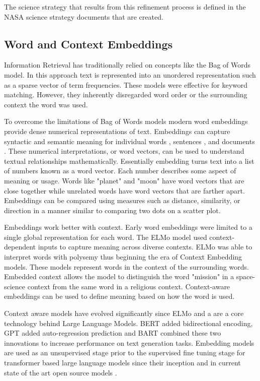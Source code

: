 \documentclass[preprint,12pt,doubleblind]{elsarticle}
\begin{document}
The science strategy that results from this refinement process is defined in the NASA science strategy documents that are created.

\subsection{Word and Context Embeddings}
Information Retrieval has traditionally relied on concepts like the Bag of Words model\cite{harris1954}. In this approach text is represented into an unordered representation such as a sparse vector of term frequencies. These models were effective for keyword matching. However, they inherently disregarded word order or the surrounding context the word was used. 

To overcome the limitations of Bag of Words models modern word embeddings provide dense numerical representations of text. Embeddings can capture syntactic and semantic meaning for individual words \cite{mikolov2013_reps_of_words}, sentences \cite{reimers2019sentencebertsentenceembeddingsusing}, and documents \cite{wu_2018_doc_embeds}. These numerical interpretations, or word vectors, can be used to understand textual relationships mathematically. Essentially embedding turns text into a list of numbers known as a word vector. Each number describes some aspect of meaning or usage. Words like "planet" and "moon" have word vectors that are close together while unrelated words have word vectors that are farther apart. Embeddings can be compared using measures such as distance, similarity, or direction in a manner similar to comparing two dots on a scatter plot.
 
Embeddings work better with context. Early word embeddings were limited to a single global representation for each word. The ELMo model \cite{peters2018deepcontextualizedwordrepresentations} used context-dependent inputs to capture meaning across diverse contexts. ELMo was able to interpret words with polysemy thus beginning the era of Context Embedding models. These models represent words in the context of the surrounding words. Embedded context allows the model to distinguish the word "mission" in a space-science context from the same word in a religious context. Context-aware embeddings can be used to define meaning based on how the word is used. 

Context aware models have evolved significantly since ELMo and a are a core technology behind Large Language Models. BERT \cite{devlin2019bert_pretraining} added bidirectional encoding, GPT \cite{radford2018improving_GPT} added auto-regression prediction and BART \cite{lewis2019bart} combined these two innovations to increase performance on text generation tasks. Embedding models are used as an unsupervised stage prior to the supervised fine tuning stage for transformer based large language models since their inception \cite{vaswani2023attentionneed} and in current state of the art open source models \cite{grattafiori2024_llama3_herdmodels}.
\end{document}
